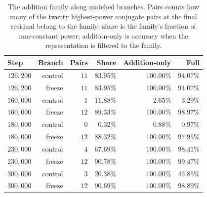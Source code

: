 \begin{table}[t]
\centering\small
\caption{The addition family along matched branches. Pairs counts how many of the twenty
highest-power conjugate pairs at the final residual belong to the family; share is the
family's fraction of non-constant power; addition-only is accuracy when the representation
is filtered to the family.}
\label{tab:coordinates}
\begin{tabular}{lrrrrr}
\toprule
Step & Branch & Pairs & Share & Addition-only & Full \\
\midrule
$126{,}200$ & control & $11$ & $83.95\%$ & $100.00\%$ & $94.07\%$ \\
$126{,}200$ & freeze & $11$ & $83.95\%$ & $100.00\%$ & $94.07\%$ \\
\midrule
$160{,}000$ & control & $1$ & $11.88\%$ & $2.65\%$ & $3.29\%$ \\
$160{,}000$ & freeze & $12$ & $89.33\%$ & $100.00\%$ & $98.97\%$ \\
$180{,}000$ & control & $0$ & $0.32\%$ & $0.88\%$ & $0.97\%$ \\
$180{,}000$ & freeze & $12$ & $88.32\%$ & $100.00\%$ & $97.95\%$ \\
$230{,}000$ & control & $4$ & $67.69\%$ & $100.00\%$ & $98.41\%$ \\
$230{,}000$ & freeze & $12$ & $90.78\%$ & $100.00\%$ & $99.47\%$ \\
$300{,}000$ & control & $3$ & $20.38\%$ & $100.00\%$ & $45.85\%$ \\
$300{,}000$ & freeze & $12$ & $90.69\%$ & $100.00\%$ & $98.89\%$ \\
\bottomrule
\end{tabular}
\end{table}
